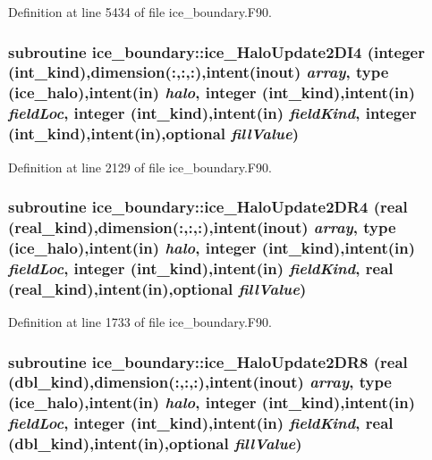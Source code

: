 Definition at line 5434 of file ice\_\-boundary.F90.\hypertarget{namespaceice__boundary_a2054b95b373530c4cc9db12585f020dc}{
\subsubsection[{ice\_\-HaloUpdate2DI4}]{\setlength{\rightskip}{0pt plus 5cm}subroutine ice\_\-boundary::ice\_\-HaloUpdate2DI4 (integer (int\_\-kind),dimension(:,:,:),intent(inout) {\em array}, \/  type (ice\_\-halo),intent(in) {\em halo}, \/  integer (int\_\-kind),intent(in) {\em fieldLoc}, \/  integer (int\_\-kind),intent(in) {\em fieldKind}, \/  integer (int\_\-kind),intent(in),optional {\em fillValue})}}
\label{namespaceice__boundary_a2054b95b373530c4cc9db12585f020dc}


Definition at line 2129 of file ice\_\-boundary.F90.\hypertarget{namespaceice__boundary_ab91c33c3f42ce191fc4edd0d19f8e6ac}{
\subsubsection[{ice\_\-HaloUpdate2DR4}]{\setlength{\rightskip}{0pt plus 5cm}subroutine ice\_\-boundary::ice\_\-HaloUpdate2DR4 (real (real\_\-kind),dimension(:,:,:),intent(inout) {\em array}, \/  type (ice\_\-halo),intent(in) {\em halo}, \/  integer (int\_\-kind),intent(in) {\em fieldLoc}, \/  integer (int\_\-kind),intent(in) {\em fieldKind}, \/  real (real\_\-kind),intent(in),optional {\em fillValue})}}
\label{namespaceice__boundary_ab91c33c3f42ce191fc4edd0d19f8e6ac}


Definition at line 1733 of file ice\_\-boundary.F90.\hypertarget{namespaceice__boundary_a87df2a8a2b6172c4e0e56332a02521b8}{
\subsubsection[{ice\_\-HaloUpdate2DR8}]{\setlength{\rightskip}{0pt plus 5cm}subroutine ice\_\-boundary::ice\_\-HaloUpdate2DR8 (real (dbl\_\-kind),dimension(:,:,:),intent(inout) {\em array}, \/  type (ice\_\-halo),intent(in) {\em halo}, \/  integer (int\_\-kind),intent(in) {\em fieldLoc}, \/  integer (int\_\-kind),intent(in) {\em fieldKind}, \/  real (dbl\_\-kind),intent(in),optional {\em fillValue})}}
\label{namespaceice__boundary_a87df2a8a2b6172c4e0e56332a02521b8}


